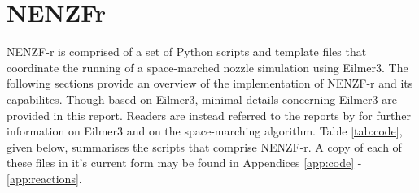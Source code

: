 
\newpage
\section{NENZFr}
\label{chapter-nenzfr}

NENZF-r is comprised of a set of Python scripts and template files that coordinate the running of a space-marched nozzle simulation using Eilmer3. The following sections provide an overview of the implementation of NENZF-r and its capabilites. Though based on Eilmer3, minimal details concerning Eilmer3 are provided in this report. Readers are instead referred to the reports by \cite{} for further information on Eilmer3 and on the space-marching algorithm. Table \ref{tab:code}, given below, summarises the scripts that comprise NENZF-r. A copy of each of these files in it's current form may be found in Appendices \ref{app:code} - \ref{app:reactions}. 


